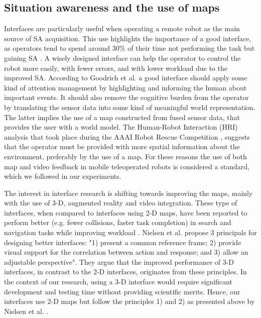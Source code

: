 \documentclass[a4paper,12pt,oneside,openright]{bhamthesis}
\begin{document}
\subsection{Situation awareness and the use of maps}
Interfaces are particularly useful when operating a remote robot as the main source of SA acquisition. This use highlights the importance of a good interface, as operators tend to spend around 30\% of their time not performing the task but gaining SA \citep{Yanco_HRI_SA_04}. A wisely designed interface can help the operator to control the robot more easily, with fewer errors, and with lower workload due to the improved SA. According to Goodrich et al. \citep{Goodrich2003} a good interface should apply some kind of attention management by highlighting and informing the human about important events. It should also remove the cognitive burden from the operator by translating the sensor data into some kind of meaningful world representation. The latter implies the use of a map constructed from fused sensor data, that provides the user with a world model. The Human-Robot Interaction (HRI) analysis that took place during the AAAI Robot Rescue Competition \citep{Yanco2004}, suggests that the operator must be provided with more spatial information about the environment, preferably by the use of a map. For these reasons the use of both map and video feedback in mobile teleoperated robots is considered a standard, which we followed in our experiments. 

The interest in interface research is shifting towards improving the maps, mainly with the use of 3-D, augmented reality and video integration. These type of interfaces, when compared to interfaces using 2-D maps, have been reported to perform better (e.g. fewer collisions, faster task completion) in search and navigation tasks while improving workload \citep{Yanco2006, Bruemmer2005, Nielsen2007a}. Nielsen et al. \citep{Nielsen2007a} propose 3 principals for designing better interfaces: "1) present a common reference frame; 2) provide visual support for the correlation between action and response; and 3) allow an adjustable perspective". They argue that the improved performance of 3-D interfaces, in contrast to the 2-D interfaces, originates from these principles. In the context of our research, using a 3-D interface would require significant development and testing time without providing scientific merits. Hence, our interfaces use 2-D maps but follow the principles 1) and 2) as presented above by Nielsen et al. \citep{Nielsen2007a}.
\end{document}
